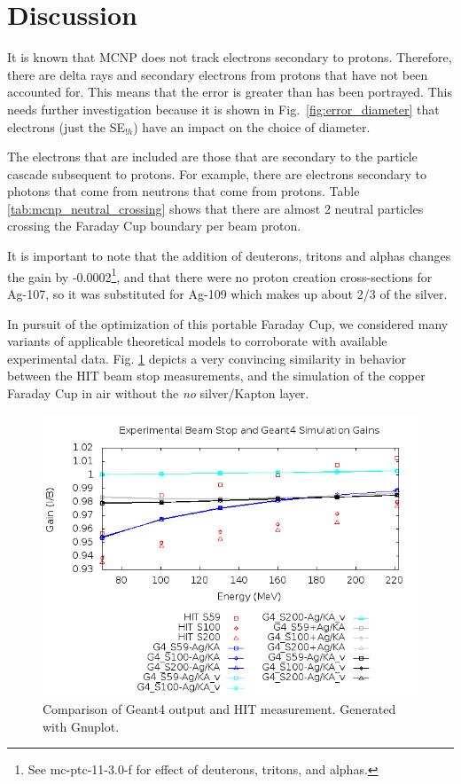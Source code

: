 \documentclass{mc2015}
\begin{document}
\section{Discussion}



It is known that MCNP does not track electrons secondary to protons. Therefore, there are delta rays and secondary electrons from protons that have not been accounted for. This means that the error is greater than has been portrayed. This needs further investigation because it is shown in Fig.~\ref{fig:error_diameter} that electrons (just the SE$_{!h}$) have an impact on the choice of diameter.

The electrons that are included are those that are secondary to the particle cascade subsequent to protons. For example, there are electrons secondary to photons that come from neutrons that come from protons. Table \ref{tab:mcnp_neutral_crossing} shows that there are almost 2 neutral particles crossing the Faraday Cup boundary per beam proton.

It is important to note that the addition of deuterons, tritons and alphas changes the gain by -0.0002\footnote{See mc-ptc-11-3.0-f for effect of deuterons, tritons, and alphas.}, and that there were no proton creation cross-sections for Ag-107, so it was substituted for Ag-109 which makes up about 2/3 of the silver.

In pursuit of the optimization of this portable Faraday Cup, we considered many variants of applicable theoretical models to corroborate with available experimental data.  Fig. \ref{fig:comp_results} depicts a very convincing similarity in behavior between the HIT beam stop measurements, and the simulation of the copper Faraday Cup in air without the \emph{no} silver/Kapton layer.

\begin{figure}[h]
  \centering
  \includegraphics[width=5in]{figures/fig_results.png}
  \caption{Comparison of Geant4 output and HIT measurement.  Generated with Gnuplot.}
  \label{fig:comp_results}
\end{figure}
\end{document}

